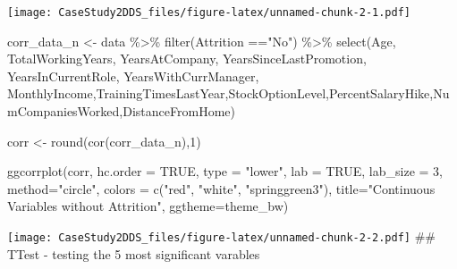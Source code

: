\documentclass[
]{article}
\newenvironment{Shaded}{\begin{snugshade}}{\end{snugshade}}
\newcommand{\AttributeTok}[1]{\textcolor[rgb]{0.77,0.63,0.00}{#1}}
\newcommand{\ConstantTok}[1]{\textcolor[rgb]{0.00,0.00,0.00}{#1}}
\newcommand{\DecValTok}[1]{\textcolor[rgb]{0.00,0.00,0.81}{#1}}
\newcommand{\FunctionTok}[1]{\textcolor[rgb]{0.00,0.00,0.00}{#1}}
\newcommand{\NormalTok}[1]{#1}
\newcommand{\OtherTok}[1]{\textcolor[rgb]{0.56,0.35,0.01}{#1}}
\newcommand{\SpecialCharTok}[1]{\textcolor[rgb]{0.00,0.00,0.00}{#1}}
\newcommand{\StringTok}[1]{\textcolor[rgb]{0.31,0.60,0.02}{#1}}
\begin{document}
\texttt{[image: CaseStudy2DDS\_files/figure-latex/unnamed-chunk-2-1.pdf]}

\begin{Shaded}
\begin{Highlighting}[]
\NormalTok{corr\_data\_n }\OtherTok{\textless{}{-}}\NormalTok{ data }\SpecialCharTok{\%\textgreater{}\%} \FunctionTok{filter}\NormalTok{(Attrition }\SpecialCharTok{==}\StringTok{"No"}\NormalTok{) }\SpecialCharTok{\%\textgreater{}\%} \FunctionTok{select}\NormalTok{(Age, TotalWorkingYears, YearsAtCompany, YearsSinceLastPromotion, YearsInCurrentRole, YearsWithCurrManager, MonthlyIncome,TrainingTimesLastYear,StockOptionLevel,PercentSalaryHike,NumCompaniesWorked,DistanceFromHome)}

\NormalTok{corr }\OtherTok{\textless{}{-}} \FunctionTok{round}\NormalTok{(}\FunctionTok{cor}\NormalTok{(corr\_data\_n),}\DecValTok{1}\NormalTok{)}

\FunctionTok{ggcorrplot}\NormalTok{(corr, }\AttributeTok{hc.order =} \ConstantTok{TRUE}\NormalTok{, }
           \AttributeTok{type =} \StringTok{"lower"}\NormalTok{, }
           \AttributeTok{lab =} \ConstantTok{TRUE}\NormalTok{, }
           \AttributeTok{lab\_size =} \DecValTok{3}\NormalTok{, }
           \AttributeTok{method=}\StringTok{"circle"}\NormalTok{, }
           \AttributeTok{colors =} \FunctionTok{c}\NormalTok{(}\StringTok{"red"}\NormalTok{, }\StringTok{"white"}\NormalTok{, }\StringTok{"springgreen3"}\NormalTok{), }
           \AttributeTok{title=}\StringTok{"Continuous Variables without Attrition"}\NormalTok{, }
           \AttributeTok{ggtheme=}\NormalTok{theme\_bw)}
\end{Highlighting}
\end{Shaded}

\texttt{[image: CaseStudy2DDS\_files/figure-latex/unnamed-chunk-2-2.pdf]}
\#\# TTest - testing the 5 most significant varables
\end{document}
